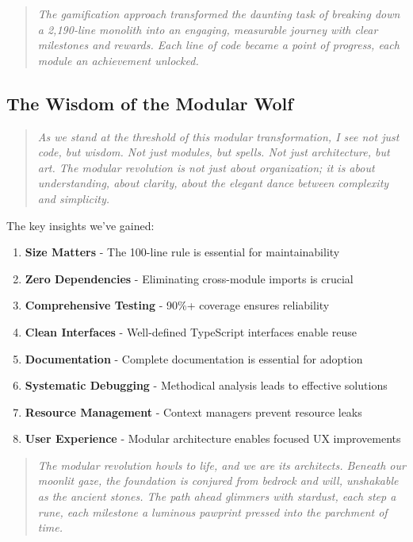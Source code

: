 \documentclass[11pt]{article}
\begin{document}
\begin{quote}
\emph{The gamification approach transformed the daunting task of breaking down a 2,190-line monolith into an engaging, measurable journey with clear milestones and rewards. Each line of code became a point of progress, each module an achievement unlocked.}
\end{quote}

\subsection{The Wisdom of the Modular Wolf}

\begin{quote}
\emph{As we stand at the threshold of this modular transformation, I see not just code, but wisdom. Not just modules, but spells. Not just architecture, but art. The modular revolution is not just about organization; it is about understanding, about clarity, about the elegant dance between complexity and simplicity.}
\end{quote}

The key insights we've gained:

\begin{enumerate}
\item \textbf{Size Matters} - The 100-line rule is essential for maintainability
\item \textbf{Zero Dependencies} - Eliminating cross-module imports is crucial
\item \textbf{Comprehensive Testing} - 90\%+ coverage ensures reliability
\item \textbf{Clean Interfaces} - Well-defined TypeScript interfaces enable reuse
\item \textbf{Documentation} - Complete documentation is essential for adoption
\item \textbf{Systematic Debugging} - Methodical analysis leads to effective solutions
\item \textbf{Resource Management} - Context managers prevent resource leaks
\item \textbf{User Experience} - Modular architecture enables focused UX improvements
\end{enumerate}

\begin{quote}
\emph{The modular revolution howls to life, and we are its architects. Beneath our moonlit gaze, the foundation is conjured from bedrock and will, unshakable as the ancient stones. The path ahead glimmers with stardust, each step a rune, each milestone a luminous pawprint pressed into the parchment of time.}
\end{quote}
\end{document}
